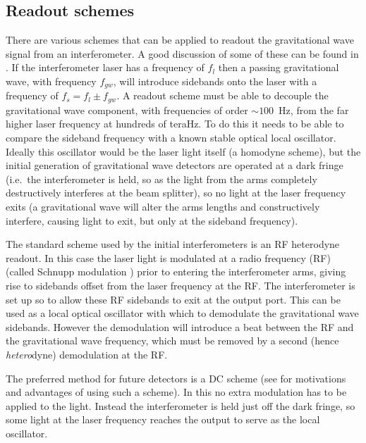 \documentclass{article}
\begin{document}
\subsection{Readout schemes}\label{sec:readout}
There are various schemes that can be applied to readout the gravitational wave
signal from an interferometer. A good discussion of some of these can be found
in \cite{Hild:2009}. If the interferometer laser has a frequency of $f_l$ then a
passing gravitational wave, with frequency $f_{gw}$, will introduce sidebands
onto the laser with a frequency of $f_s = f_l \pm f_{gw}$. A readout scheme must
be able to decouple the gravitational wave component, with frequencies of order
$\sim100$~Hz, from the far higher laser frequency at hundreds of teraHz. To do
this it needs to be able to compare the sideband frequency with a known stable
optical local oscillator. Ideally this oscillator would be the laser light
itself (a homodyne scheme), but the initial generation of gravitational wave
detectors are operated at a dark fringe (i.e.~the interferometer is held, so as
the light from the arms completely destructively interferes at the beam
splitter), so no light at the laser frequency exits (a gravitational wave will
alter the arms lengths and constructively interfere, causing light to exit, but
only at the sideband frequency).

The standard scheme used by the initial interferometers is an RF heterodyne
readout. In this case the laser light is modulated at a radio frequency (RF)
(called Schnupp modulation \cite{Schnupp:1988}) prior to entering the
interferometer arms, giving rise to sidebands offset from the laser frequency at
the RF. The interferometer is set up so to allow these RF sidebands to exit at
the output port. This can be used as a local optical oscillator with which to
demodulate the gravitational wave sidebands. However the demodulation will
introduce a beat between the RF and the gravitational wave frequency, which must
be removed by a second (hence {\it hetero}dyne) demodulation at the RF.

The preferred method for future detectors is a DC scheme (see
\cite{Fritschel:2003, Ward:2008, Hild:2009} for motivations and advantages of
using such a scheme). In this no extra modulation has to be applied to the
light. Instead the interferometer is held just off the dark fringe, so some
light at the laser frequency reaches the output to serve as the local
oscillator.

\end{document}
